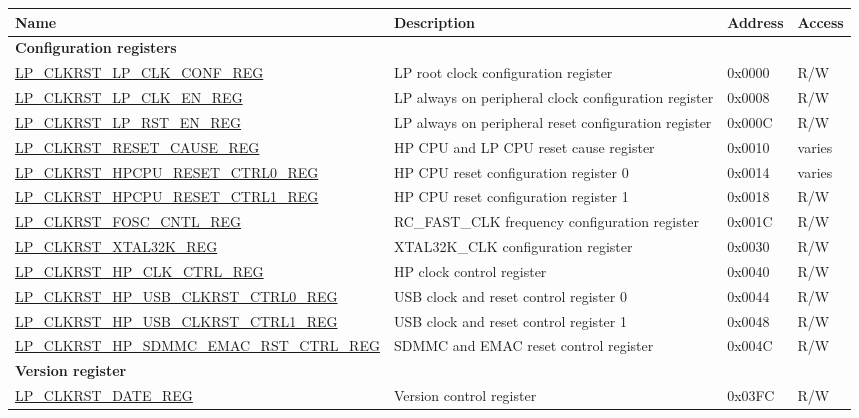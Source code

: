 \begin{longtable}{ | p{7.5cm} | p{6.2cm} | p{1.3cm} | p{1cm} | }
\hline\rowcolor{lightgray}
Name & Description &  Address & Access \\ \hline
\endhead
\multicolumn{4}{|l|}{\textbf{Configuration registers}} \\ \hline
\hyperref[regdesc:LPCLKRSTLPCLKCONFREG]{LP\_CLKRST\_LP\_CLK\_CONF\_REG} & LP root clock configuration register & 0x0000 & R/W \\ \hline
\hyperref[regdesc:LPCLKRSTLPCLKENREG]{LP\_CLKRST\_LP\_CLK\_EN\_REG} & LP always on peripheral clock configuration register & 0x0008 & R/W \\ \hline
\hyperref[regdesc:LPCLKRSTLPRSTENREG]{LP\_CLKRST\_LP\_RST\_EN\_REG} & LP always on peripheral reset configuration register & 0x000C & R/W \\ \hline
\hyperref[regdesc:LPCLKRSTRESETCAUSEREG]{LP\_CLKRST\_RESET\_CAUSE\_REG} & HP CPU and LP CPU reset cause register & 0x0010 & varies \\ \hline
\hyperref[regdesc:LPCLKRSTHPCPURESETCTRL0REG]{LP\_CLKRST\_HPCPU\_RESET\_CTRL0\_REG} & HP CPU reset configuration register 0 & 0x0014 & varies \\ \hline
\hyperref[regdesc:LPCLKRSTHPCPURESETCTRL1REG]{LP\_CLKRST\_HPCPU\_RESET\_CTRL1\_REG} & HP CPU reset configuration register 1 & 0x0018 & R/W \\ \hline
\hyperref[regdesc:LPCLKRSTFOSCCNTLREG]{LP\_CLKRST\_FOSC\_CNTL\_REG} & RC\_FAST\_CLK frequency configuration register & 0x001C & R/W \\ \hline
\hyperref[regdesc:LPCLKRSTXTAL32KREG]{LP\_CLKRST\_XTAL32K\_REG} & XTAL32K\_CLK configuration register & 0x0030 & R/W \\ \hline
\hyperref[regdesc:LPCLKRSTHPCLKCTRLREG]{LP\_CLKRST\_HP\_CLK\_CTRL\_REG} & HP clock control register & 0x0040 & R/W \\ \hline
\hyperref[regdesc:LPCLKRSTHPUSBCLKRSTCTRL0REG]{LP\_CLKRST\_HP\_USB\_CLKRST\_CTRL0\_REG} & USB clock and reset control register 0 & 0x0044 & R/W \\ \hline
\hyperref[regdesc:LPCLKRSTHPUSBCLKRSTCTRL1REG]{LP\_CLKRST\_HP\_USB\_CLKRST\_CTRL1\_REG} & USB clock and reset control register 1 & 0x0048 & R/W \\ \hline
\hyperref[regdesc:LPCLKRSTHPSDMMCEMACRSTCTRLREG]{LP\_CLKRST\_HP\_SDMMC\_EMAC\_RST\_CTRL\_REG} & SDMMC and EMAC reset control register & 0x004C & R/W \\ \hline
\multicolumn{4}{|l|}{\textbf{Version register}} \\ \hline
\hyperref[regdesc:LPCLKRSTDATEREG]{LP\_CLKRST\_DATE\_REG} & Version control register & 0x03FC & R/W \\ \hline
\end{longtable}
